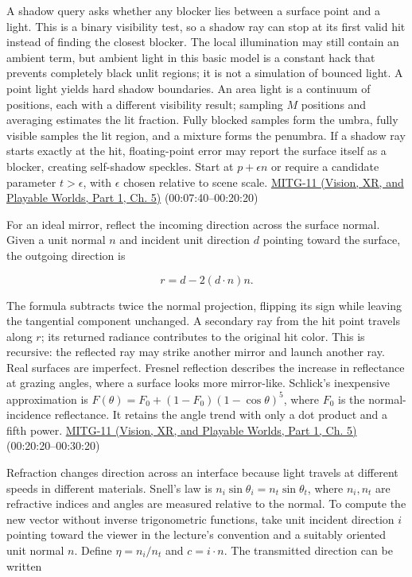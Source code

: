 A shadow query asks whether any blocker lies between a surface point and a light. This is a binary visibility test, so a shadow ray can stop at its first valid hit instead of finding the closest blocker. The local illumination may still contain an ambient term, but ambient light in this basic model is a constant hack that prevents completely black unlit regions; it is not a simulation of bounced light. A point light yields hard shadow boundaries. An area light is a continuum of positions, each with a different visibility result; sampling \(M\) positions and averaging estimates the lit fraction. Fully blocked samples form the umbra, fully visible samples the lit region, and a mixture forms the penumbra. If a shadow ray starts exactly at the hit, floating-point error may report the surface itself as a blocker, creating self-shadow speckles. Start at \(p+\epsilon n\) or require a candidate parameter \(t>\epsilon\), with \(\epsilon\) chosen relative to scene scale. \href{../07-Vision-XR-and-Playable-Worlds-P01/main.pdf\#nameddest=04-visual-computing-ii-ch036-mitg-11---ray-tracing}{MITG-11 (Vision, XR, and Playable Worlds, Part 1, Ch. 5)} (00:07:40--00:20:20)

For an ideal mirror, reflect the incoming direction across the surface normal. Given a unit normal \(n\) and incident unit direction \(d\) pointing toward the surface, the outgoing direction is

\[
r=d-2(d\cdot n)n.
\]

The formula subtracts twice the normal projection, flipping its sign while leaving the tangential component unchanged. A secondary ray from the hit point travels along \(r\); its returned radiance contributes to the original hit color. This is recursive: the reflected ray may strike another mirror and launch another ray. Real surfaces are imperfect. Fresnel reflection describes the increase in reflectance at grazing angles, where a surface looks more mirror-like. Schlick's inexpensive approximation is \(F(\theta)=F_0+(1-F_0)(1-\cos\theta)^5\), where \(F_0\) is the normal-incidence reflectance. It retains the angle trend with only a dot product and a fifth power. \href{../07-Vision-XR-and-Playable-Worlds-P01/main.pdf\#nameddest=04-visual-computing-ii-ch036-mitg-11---ray-tracing}{MITG-11 (Vision, XR, and Playable Worlds, Part 1, Ch. 5)} (00:20:20--00:30:20)

Refraction changes direction across an interface because light travels at different speeds in different materials. Snell's law is \(n_i\sin\theta_i=n_t\sin\theta_t\), where \(n_i,n_t\) are refractive indices and angles are measured relative to the normal. To compute the new vector without inverse trigonometric functions, take unit incident direction \(i\) pointing toward the viewer in the lecture's convention and a suitably oriented unit normal \(n\). Define \(\eta=n_i/n_t\) and \(c=i\cdot n\). The transmitted direction can be written

